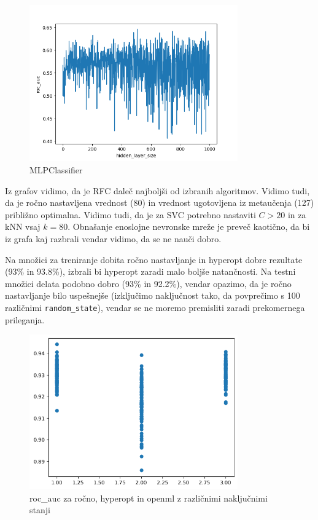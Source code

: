 \documentclass{article}
\begin{document}
\begin{figure}[h!]
    \caption{MLPClassifier}
    \centering
    \includegraphics[width=0.8\textwidth]{mlp}
\end{figure}

Iz grafov vidimo, da je RFC daleč najboljši od izbranih algoritmov. Vidimo tudi, da je ročno nastavljena vrednost (80) in vrednost ugotovljena iz metaučenja (127) približno optimalna. Vidimo tudi, da je za SVC potrebno nastaviti $C>20$ in za kNN vsaj $k=80$. Obnašanje enoslojne nevronske mreže je preveč kaotično, da bi iz grafa kaj razbrali vendar vidimo, da se ne nauči dobro.

Na množici za treniranje dobita ročno nastavljanje in hyperopt dobre rezultate (93\% in 93.8\%), izbrali bi hyperopt zaradi malo boljše natančnosti. Na testni množici delata podobno dobro (93\% in 92.2\%), vendar opazimo, da je ročno nastavljanje bilo uspešnejše (izključimo naključnost tako, da povprečimo s 100 različnimi \verb|random_state|), vendar se ne moremo premisliti zaradi prekomernega prileganja.
\begin{figure}[h]
    \caption{roc\_auc za ročno, hyperopt in openml z različnimi naključnimi stanji}
    \centering
    \includegraphics[width=0.8\textwidth]{scores}
\end{figure}
\end{document}
